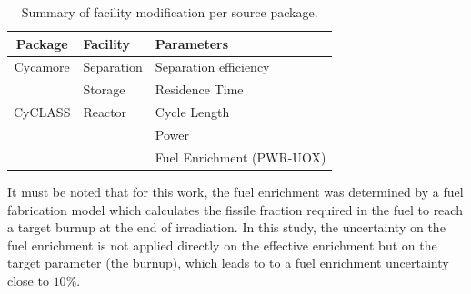 \documentclass{anstrans}
\begin{document}
\begin{table}[htb]
\centering
  \caption{Summary of facility modification per source package.}
\begin{tabular}{cll}
\toprule

Package   & Facility   & Parameters                \\
\midrule
Cycamore & Separation & Separation efficiency     \\
         & Storage    & Residence Time            \\
\midrule
CyCLASS  & Reactor    & Cycle Length              \\
         &            & Power                     \\
         &            & Fuel Enrichment (PWR-UOX) \\

\bottomrule
\end{tabular}

  \label{tab:package_uncertainty}
\end{table}

It must be noted that for this work, the fuel enrichment was determined by a
fuel fabrication model\cite{Leniau2015125} which
calculates the fissile fraction required in the fuel to reach a target
burnup at the end of irradiation. In this study, the uncertainty on the fuel
enrichment is not applied directly on the effective enrichment but on the target
parameter (the burnup), which leads to to a fuel enrichment uncertainty close to
$10\%$.
\end{document}

